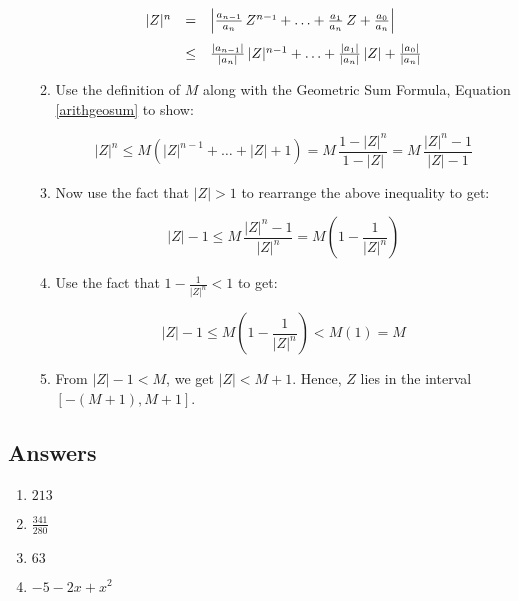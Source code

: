 \documentclass{ximera}
\begin{document}
\begin{enumerate}
\begin{enumerate}
\[\begin{array}{rcl} 

 |Z|^{n} & = &  \left| \frac{a_{n-\mbox{\tiny$1$}}}{a_{n}} \, Z^{n-\mbox{\tiny$1$}} + \ldots + \frac{a_{\mbox{\tiny$1$}}}{a_{n}} \,  Z + \frac{a_{\mbox{\tiny$0$}}}{a_{n}} \right|  \\[10pt]
 
 & \leq &  \frac{|a_{n-1}|}{|a_{n}|} \, |Z|^{n-1} + \ldots + \frac{|a_{1}|}{|a_{n}|} \, |Z| + \frac{|a_{0}|}{|a_{n}|} \\ \end{array} \]

\item  Use the definition of  $M$  along with the Geometric Sum Formula, Equation \ref{arithgeosum} to show:

\[ |Z|^{n} \leq M \left( |Z|^{n-1} + \ldots + |Z| + 1\right) = M \, \dfrac{1 - |Z|^n}{1 - |Z|} =  M \,  \dfrac{ |Z|^n - 1}{|Z| - 1} \]

\item  Now use the fact that $|Z| > 1$ to rearrange the above inequality to get:

\[ |Z| - 1 \leq M \, \dfrac{|Z|^{n} - 1}{|Z|^n} = M \left( 1 - \frac{1}{|Z|^n} \right) \]

\item  Use the fact that $1 - \frac{1}{|Z|^n} < 1$ to get:  

\[ |Z| - 1 \leq  M \left( 1 - \frac{1}{|Z|^n} \right)  < M (1) = M\]

\item  From $|Z| - 1 < M$, we get $|Z| < M+1$.  Hence, $Z$ lies in the interval  $\left[-(M+1), M+1\right]$.

\end{enumerate}



\end{enumerate}
\newpage

\subsection{Answers}

\begin{multicols}{4} 
\begin{enumerate}

\item $213$
\item $\frac{341}{280}$
\item $63$
\item $-5 - 2x + x^{2}$

\setcounter{HW}{\value{enumi}}
\end{enumerate}
\end{multicols}
\end{document}

